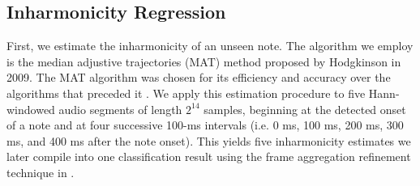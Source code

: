 \documentclass[convention,peer-reviewed]{aesconf}
\begin{document}
\subsection{Inharmonicity Regression}
First, we estimate the inharmonicity of an unseen note. The algorithm we employ is the median adjustive trajectories (MAT) method \citep{hodgkinson2009} proposed by Hodgkinson in 2009. The MAT algorithm was chosen for its efficiency and accuracy over the algorithms that preceded it \citep{hodgkinson2009}. We apply this estimation procedure to five Hann-windowed audio segments of length $2^{14}$ samples, beginning at the detected onset of a note and at four successive 100-ms intervals (i.e. 0 ms, 100 ms, 200 ms, 300 ms, and 400 ms after the note onset). This yields five inharmonicity estimates we later compile into one classification result using the frame aggregation refinement technique in \citep{abesser2012}.
\end{document}
